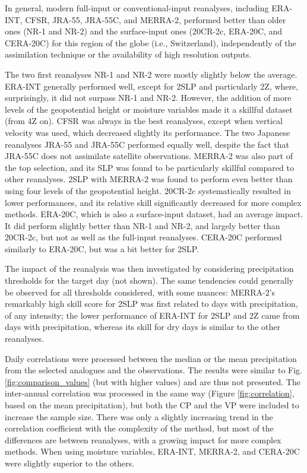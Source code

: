 \documentclass[smallextended]{svjour3}       %
\begin{document}
	In general, modern full-input or conventional-input reanalyses, including ERA-INT, CFSR, JRA-55, JRA-55C, and MERRA-2, performed better than older ones (NR-1 and NR-2) and the surface-input ones (20CR-2c, ERA-20C, and CERA-20C) for this region of the globe (i.e., Switzerland), independently of the assimilation technique or the availability of high resolution outputs.
	
	The two first reanalyses NR-1 and NR-2 were mostly slightly below the average. ERA-INT generally performed well, except for 2SLP and particularly 2Z, where, surprisingly, it did not surpass NR-1 and NR-2. However, the addition of more levels of the geopotential height or moisture variables made it a skillful dataset (from 4Z on). CFSR was always in the best reanalyses, except when vertical velocity was used, which decreased slightly its performance. The two Japanese reanalyses JRA-55 and JRA-55C performed equally well, despite the fact that JRA-55C does not assimilate satellite observations. MERRA-2 was also part of the top selection, and its SLP was found to be particularly skillful compared to other reanalyses. 2SLP with MERRA-2 was found to perform even better than using four levels of the geopotential height. 20CR-2c systematically resulted in lower performances, and its relative skill significantly decreased for more complex methods. ERA-20C, which is also a surface-input dataset, had an average impact. It did perform slightly better than NR-1 and NR-2, and largely better than 20CR-2c, but not as well as the full-input reanalyses. CERA-20C performed similarly to ERA-20C, but was a bit better for 2SLP.
	
	The impact of the reanalysis was then investigated by considering precipitation thresholds for the target day (not shown). The same tendencies could generally be observed for all thresholds considered, with some nuances: MERRA-2's remarkably high skill score for 2SLP was first related to days with precipitation, of any intensity; the lower performance of ERA-INT for 2SLP and 2Z came from days with precipitation, whereas its skill for dry days is similar to the other reanalyses.
	
	Daily correlations were processed between the median or the mean precipitation from the selected analogues and the observations. The results were similar to Fig. \ref{fig:comparison_values} (but with higher values) and are thus not presented. The inter-annual correlation was processed in the same way (Figure \ref{fig:correlation}, based on the mean precipitation), but both the CP and the VP were included to increase the sample size. There was only a slightly increasing trend in the correlation coefficient with the complexity of the method, but most of the differences are between reanalyses, with a growing impact for more complex methods. When using moisture variables, ERA-INT, MERRA-2, and CERA-20C were slightly superior to the others.
	
\end{document}

